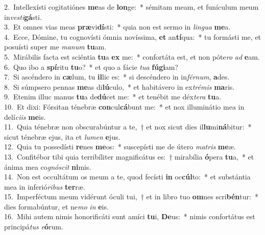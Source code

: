 {2.~}Intellexísti cogitatiónes \textbf{me}as de \textbf{lon}ge:~* sémitam meam, et funículum meum in\textit{ve}\textit{sti}\textbf{gá}sti.\\
{3.~}Et omnes vias meas \textbf{præ}vi\textbf{dí}sti:~* quia non est sermo in \textit{lin}\textit{gua} \textbf{me}a.\\
{4.~}Ecce, Dómine, tu cognovísti ómnia novíssima, \textbf{et} an\textbf{tí}qua:~* tu formásti me, et posuísti super me \textit{ma}\textit{num} \textbf{tu}am.\\
{5.~}Mirábilis facta est sciéntia \textbf{tu}a \textbf{ex} me:~* confortáta est, et non póte\textit{ro} \textit{ad} \textbf{e}am.\\
{6.~}Quo ibo a \textbf{spí}ritu \textbf{tu}o?~* et quo a fácie \textit{tu}\textit{a} \textbf{fú}\textbf{gi}am?\\
{7.~}Si ascéndero in \textbf{cæ}lum, tu \textbf{il}lic es:~* si descéndero in in\textit{fér}\textit{num}, \textbf{a}des.\\
{8.~}Si súmpsero pennas \textbf{me}as di\textbf{lú}culo,~* et habitávero in ex\textit{tré}\textit{mis} \textbf{ma}ris.\\
{9.~}Etenim illuc manus \textbf{tu}a de\textbf{dú}cet me:~* et tenébit me déx\textit{te}\textit{ra} \textbf{tu}a.\\
{10.~}Et dixi: Fórsitan ténebræ \textbf{con}cul\textbf{cá}bunt me:~* et nox illuminátio mea in delí\textit{ci}\textit{is} \textbf{me}is.\\
{11.~}Quia ténebræ non obscurabúntur a te,~† et nox sicut dies il\textbf{lu}mi\textbf{ná}bitur:~* sicut ténebræ ejus, ita et \textit{lu}\textit{men} \textbf{e}jus.\\
{12.~}Quia tu possedísti \textbf{re}nes \textbf{me}os:~* suscepísti me de útero \textit{ma}\textit{tris} \textbf{me}æ.\\
{13.~}Confitébor tibi quia terribíliter magnificátus es:~† mirabília \textbf{ó}pera \textbf{tu}a,~* et ánima mea co\textit{gnó}\textit{scit} \textbf{ni}mis.\\
{14.~}Non est occultátum os meum a te, quod fecísti \textbf{in} oc\textbf{cúl}to:~* et substántia mea in inferió\textit{ri}\textit{bus} \textbf{ter}ræ.\\
{15.~}Imperféctum meum vidérunt óculi tui,~† et in libro tuo \textbf{om}nes scri\textbf{bén}tur:~* dies formabúntur, et ne\textit{mo} \textit{in} \textbf{e}is.\\
{16.~}Mihi autem nimis honorificáti sunt amíci \textbf{tu}i, \textbf{De}us:~* nimis confortátus est principá\textit{tus} \textit{e}\textbf{ó}rum.\\
